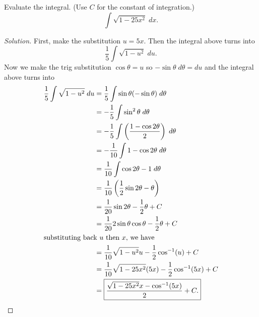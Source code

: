 \begin{problem}[WebAssign, HW 12, \# 2]
Evaluate the integral. (Use $C$ for the constant of integration.)
\[
\int\sqrt{1-25x^2}\;dx.
\]
\end{problem}
\begin{proof}[Solution]
First, make the substitution $u=5x$. Then the integral above turns into
\[
\frac{1}{5}\int\sqrt{1-u^2}\;du.
\]
Now we make the trig substitution $\cos\theta=u$ so
$-\sin\theta\;d\theta=du$ and the integral above turns into
\begin{align*}
\frac{1}{5}\int\sqrt{1-u^2}\;du&=\frac{1}{5}\int\sin\theta(-\sin\theta)\;d\theta\\
&=-\frac{1}{5}\int\sin^2\theta\;d\theta\\
&=-\frac{1}{5}\int\left(\frac{1-\cos2\theta}{2}\right)\;d\theta\\
&=-\frac{1}{10}\int 1-\cos2\theta\;d\theta\\
&=\frac{1}{10}\int\cos2\theta-1\;d\theta\\
&=\frac{1}{10}\left(\frac{1}{2}\sin2\theta-\theta\right)\\
&=\frac{1}{20}\sin 2\theta-\frac{1}{2}\theta+C\\
&=\frac{1}{20}2\sin\theta\cos\theta-\frac{1}{2}\theta+C\\
\intertext{substituting back $u$ then $x$, we have}
&=\frac{1}{10}\sqrt{1-u^2}u-\frac{1}{2}\cos^{-1}(u)+C\\
&=\frac{1}{10}\sqrt{1-25x^2}(5x)-\frac{1}{2}\cos^{-1}(5x)+C\\
&=\boxed{\frac{\sqrt{1-25x^2}x-\cos^{-1}(5x)}{2}+C.}\qedhere
\end{align*}
\end{proof}

